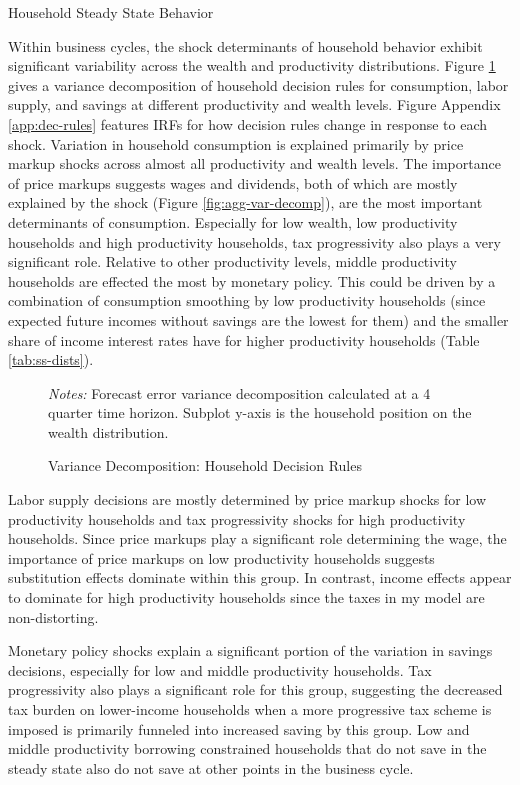 \begin{table}[t]
    \centering
    \caption{Household Steady State Behavior}
    
    \label{tab:ss-dists}
\end{table}

Within business cycles, the shock determinants of household behavior exhibit significant variability across the wealth and productivity distributions. Figure \ref{fig:hh-var-decomp} gives a variance decomposition of household decision rules for consumption, labor supply, and savings at different productivity and wealth levels. Figure Appendix \ref{app:dec-rules} features IRFs for how decision rules change in response to each shock. Variation in household consumption is explained primarily by price markup shocks across almost all productivity and wealth levels. The importance of price markups suggests wages and dividends, both of which are mostly explained by the shock (Figure \ref{fig:agg-var-decomp}), are the most important determinants of consumption. Especially for low wealth, low productivity households and high productivity households, tax progressivity also plays a very significant role. Relative to other productivity levels, middle productivity households are effected the most by monetary policy. This could be driven by a combination of consumption smoothing by low productivity households (since expected future incomes without savings are the lowest for them) and the smaller share of income interest rates have for higher productivity households (Table \ref{tab:ss-dists}).

\begin{figure}[t!]  %
    \centering
    \caption{Variance Decomposition: Household Decision Rules}
    
    {\scriptsize \textit{Notes:} Forecast error variance decomposition calculated at a 4 quarter time horizon. Subplot y-axis is the household position on the wealth distribution.}
    \label{fig:hh-var-decomp}
\end{figure}

Labor supply decisions are mostly determined by price markup shocks for low productivity households and tax progressivity shocks for high productivity households. Since price markups play a significant role determining the wage, the importance of price markups on low productivity households suggests substitution effects dominate within this group. In contrast, income effects appear to dominate for high productivity households since the taxes in my model are non-distorting.

Monetary policy shocks explain a significant portion of the variation in savings decisions, especially for low and middle productivity households. Tax progressivity also plays a significant role for this group, suggesting the decreased tax burden on lower-income households when a more progressive tax scheme is imposed is primarily funneled into increased saving by this group. Low and middle productivity borrowing constrained households that do not save in the steady state also do not save at other points in the business cycle.
